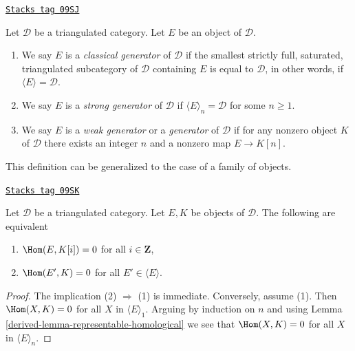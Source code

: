 \begin{definition}[Generators]
\label{derived-definition-generators}
\href{https://stacks.math.columbia.edu/tag/09SJ}{\texttt{Stacks tag 09SJ}}

Let $\mathcal{D}$ be a triangulated category. Let $E$ be an object
of $\mathcal{D}$.
\begin{enumerate}
\item We say $E$ is a {\it classical generator} of $\mathcal{D}$
if the smallest strictly full, saturated, triangulated subcategory
of $\mathcal{D}$ containing $E$ is equal to $\mathcal{D}$, in
other words, if $\langle E \rangle = \mathcal{D}$.
\item We say $E$ is a {\it strong generator} of $\mathcal{D}$
if $\langle E \rangle_n = \mathcal{D}$ for some $n \geq 1$.
\item We say $E$ is a {\it weak generator} or a {\it generator}
of $\mathcal{D}$
if for any nonzero object $K$ of $\mathcal{D}$ there exists
an integer $n$ and a nonzero map $E \to K[n]$.
\end{enumerate}
\end{definition}

This definition can be generalized to the case of a family of objects.

\begin{lemma}
\label{derived-lemma-right-orthogonal}
\href{https://stacks.math.columbia.edu/tag/09SK}{\texttt{Stacks tag 09SK}}

Let $\mathcal{D}$ be a triangulated category. Let $E, K$ be objects
of $\mathcal{D}$. The following are equivalent
\begin{enumerate}
\item $\Hom(E, K[i]) = 0$ for all $i \in \mathbf{Z}$,
\item $\Hom(E', K) = 0$ for all $E' \in \langle E \rangle$.
\end{enumerate}
\end{lemma}

\begin{proof}

The implication (2) $\Rightarrow$ (1) is immediate. Conversely,
assume (1). Then $\Hom(X, K) = 0$ for all $X$ in $\langle E \rangle_1$.
Arguing by induction on $n$ and using
Lemma \ref{derived-lemma-representable-homological}
we see that $\Hom(X, K) = 0$ for all $X$
in $\langle E \rangle_n$.
\end{proof}

